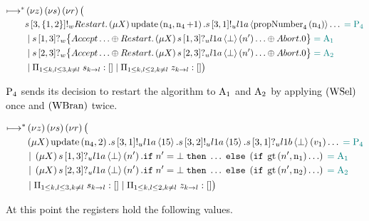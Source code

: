 \begin{align*}
\longmapsto^*& \left(\nu z\right)\left(\nu s\right)\left(\nu r\right) \big (\\
&
    s\left[3, \left\{1,2\right\}\right]!_w \mathnormal{Restart}.
    \left(\mu X\right)
    \operatorname{update} \left(\operatorname{n}_4, \operatorname{n}_4 + 1\right).
    s\left[3, 1\right]!_u l1a \left\langle \operatorname{propNumber}_4\left( \operatorname{n}_4\right) \right\rangle\ldots
    \;\textcolor{teal}{= \operatorname{P_{4}}}\\
&\; | \;
    s\left[1, 3\right]?_w \big\{
        \mathnormal{Accept} \ldots
        \oplus
            \mathnormal{Restart} .
            \left(\mu X\right) s\left[1, 3\right]?_u l1a \left\langle \bot \right\rangle \left(n'\right)\ldots
        \oplus \mathnormal{Abort} . 0
    \big\} \;\textcolor{teal}{= \operatorname{A_{1}}}\\
&\; | \;
    s\left[2, 3\right]?_w \big\{
        \mathnormal{Accept} \ldots
        \oplus
            \mathnormal{Restart} .
            \left(\mu X\right) s\left[2, 3\right]?_u l1a \left\langle \bot \right\rangle \left(n'\right)\ldots
        \oplus \mathnormal{Abort} . 0
    \big\} \;\textcolor{teal}{= \operatorname{A_{2}}}\\
&\; | \; \Pi_{1 \le k,l \le 3, k \neq l}\; s_{k\to l}:[]
\; | \; \Pi_{1 \le k,l \le 2, k \neq l}\; z_{k\to l}:[]
\big )
\end{align*}

$\operatorname{P_{4}}$ sends its decision to restart the algorithm to $\operatorname{A_{1}}$ and $\operatorname{A_{2}}$ by applying $\left(\operatorname{WSel}\right)$ once and $\left(\operatorname{WBran}\right)$ twice.

\begin{align*}
\longmapsto^*& \left(\nu z\right)\left(\nu s\right)\left(\nu r\right) \big (\\
&
    \left(\mu X\right)
    \operatorname{update} \left(\operatorname{n}_4, 2\right).
    s\left[3, 1\right]!_u l1a \left\langle 15 \right\rangle.
    s\left[3, 2\right]!_u l1a \left\langle 15 \right\rangle.
    s\left[3, 1\right]?_u l1b \left\langle \bot \right\rangle \left(v_1\right)\ldots
    \;\textcolor{teal}{= \operatorname{P_{4}}}\\
&\; | \;
    \left(\mu X\right)
    s\left[1, 3\right]?_u l1a \left\langle \bot \right\rangle \left(n'\right).
    \mathtt{if}\; n' = \bot
    \;\mathtt{then}\; \ldots
    \;\mathtt{else}\;
        \left(
            \mathtt{if}\; \operatorname{gt}\left(n', \operatorname{n}_1\right)
            \ldots
        \right)
    \;\textcolor{teal}{= \operatorname{A_{1}}}\\
&\; | \;
    \left(\mu X\right)
    s\left[2, 3\right]?_u l1a \left\langle \bot \right\rangle \left(n'\right).
    \mathtt{if}\; n' = \bot
    \;\mathtt{then}\; \ldots
    \;\mathtt{else}\;
        \left(
            \mathtt{if}\; \operatorname{gt}\left(n', \operatorname{n}_2\right)
            \ldots
        \right)
    \;\textcolor{teal}{= \operatorname{A_{2}}}\\
&\; | \; \Pi_{1 \le k,l \le 3, k \neq l}\; s_{k\to l}:[]
\; | \; \Pi_{1 \le k,l \le 2, k \neq l}\; z_{k\to l}:[]
\big )
\end{align*}

At this point the registers hold the following values.

